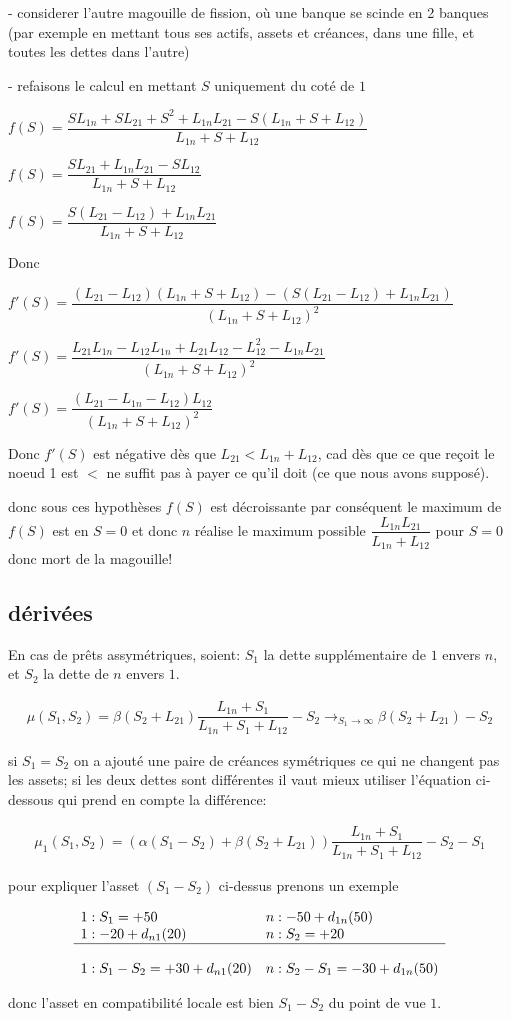 \documentclass{article}
\def\AR#1{
\[
\begin{array}{llllllll}
#1
\end{array}
\]
}
\begin{document}
- considerer l'autre magouille de fission, où une banque se scinde en 2 banques (par exemple en mettant tous ses actifs, assets et créances, dans une fille, et toutes les dettes dans l'autre)

- refaisons le calcul en mettant $S$ uniquement du coté de $1$


$f(S) =
\dfrac
{SL_{1n}+SL_{21}+S^{2}+L_{1n}L_{21} - S(L_{1n}+S+L_{12})}
{L_{1n}+S+L_{12}}
$

$f(S) =
\dfrac
{SL_{21}+L_{1n}L_{21} - SL_{12}}
{L_{1n}+S+L_{12}}
$

$f(S) = 
\dfrac
{S(L_{21} - L_{12})+L_{1n}L_{21}}
{L_{1n}+S+L_{12}}
$

Donc 


$f'(S) = 
\dfrac
{(L_{21} - L_{12})(L_{1n}+S+L_{12}) - (S(L_{21} - L_{12})+L_{1n}L_{21})}
{(L_{1n}+S+L_{12})^{2}}
$

$f'(S) = 
\dfrac
{L_{21}L_{1n} - L_{12}L_{1n} + L_{21}L_{12} - L_{12}^{2} - L_{1n}L_{21}}
{(L_{1n}+S+L_{12})^{2}}
$

$f'(S) = 
\dfrac
{(L_{21} - L_{1n} - L_{12})L_{12}}
{(L_{1n}+S+L_{12})^{2}}
$


Donc $f'(S)$ est négative dès que $L_{21} <  L_{1n} + L_{12}$,
cad dès que ce que reçoit le noeud 1 est $<$ ne suffit pas à 
payer ce qu'il doit (ce que nous avons supposé).

donc sous ces hypothèses $f(S)$ est décroissante par conséquent le maximum de $f(S)$ est en $S = 0$ et donc $n$ réalise le maximum possible
$\dfrac
{L_{1n}L_{21}}
{L_{1n}+L_{12}}
$
pour $S=0$ donc mort de la magouille!


\subsection{dérivées}

En cas de prêts assymétriques, soient: 
$S_{1}$ la dette supplémentaire de $1$ envers $n$, et 
$S_{2}$ la dette de $n$ envers $1$.

\AR{
\mu(S_{1},S_{2}) = 
\beta
(S_{2} + L_{21}) 
\dfrac
{L_{1n}+S_{1}}
{L_{1n}+S_{1}+L_{12}}
- S_{2}
\to_{S_1\to\infty}
\beta
(S_{2} + L_{21})- S_{2}
}
si $S_1=S_2$ on a ajouté une paire de créances symétriques ce qui ne changent pas les assets; si les deux dettes sont différentes il vaut mieux utiliser l'équation ci-dessous qui prend en compte la différence:
\AR{
\mu_1(S_{1},S_{2}) = 
(\alpha (S_{1}-S_2) + 
\beta
(S_{2} + L_{21}))
\dfrac
{L_{1n}+S_{1}}
{L_{1n}+S_{1}+L_{12}}
- S_{2} - S_{1}
}
pour expliquer l'asset $(S_{1}-S_2)$ ci-dessus
prenons un exemple
\AR{
1: S_1=+50 & n: -50 + d_{1n}(50)\\
1: -20 + d_{n1}(20)& n: S_2=+20
\\\hline\\
1: 
S_1-S_2=+30 
+ d_{n1}(20)&
n:
S_2-S_1=-30 + d_{1n}(50)
}
donc l'asset en compatibilité locale est bien $S_1-S_2$ du point de vue $1$.
\end{document}
